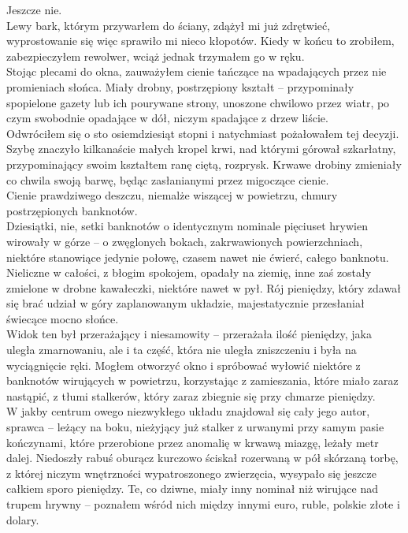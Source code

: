 \documentclass[../MAIN.tex]{subfiles}
\begin{document}
Jeszcze nie.\\
Lewy bark, którym przywarłem do ściany, zdążył mi już zdrętwieć, wyprostowanie się więc sprawiło mi nieco kłopotów. Kiedy w końcu to zrobiłem, zabezpieczyłem rewolwer, wciąż jednak trzymałem go w ręku.\\
Stojąc plecami do okna, zauważyłem cienie tańczące na wpadających przez nie promieniach słońca. Miały drobny, postrzępiony kształt -- przypominały spopielone gazety lub ich pourywane strony, unoszone chwilowo przez wiatr, po czym swobodnie opadające w dół, niczym spadające z drzew liście.\\
Odwróciłem się o sto osiemdziesiąt stopni i natychmiast pożałowałem tej decyzji.\\
Szybę znaczyło kilkanaście małych kropel krwi, nad którymi górował szkarłatny, przypominający swoim kształtem ranę ciętą, rozprysk. Krwawe drobiny zmieniały co chwila swoją barwę, będąc zasłanianymi przez migoczące cienie.\\
Cienie prawdziwego deszczu, niemalże wiszącej w powietrzu, chmury postrzępionych banknotów.\\
Dziesiątki, nie, setki banknotów o identycznym nominale pięciuset hrywien wirowały w górze -- o zwęglonych bokach, zakrwawionych powierzchniach, niektóre stanowiące jedynie połowę, czasem nawet nie ćwierć, całego banknotu. Nieliczne w całości, z błogim spokojem, opadały na ziemię, inne zaś zostały zmielone w drobne kawałeczki, niektóre nawet w pył. Rój pieniędzy, który zdawał się brać udział w góry zaplanowanym układzie, majestatycznie przesłaniał świecące mocno słońce.\\
Widok ten był przerażający i niesamowity -- przerażała ilość pieniędzy, jaka uległa zmarnowaniu, ale i ta część, która nie uległa zniszczeniu i była na wyciągnięcie ręki. Mogłem otworzyć okno i spróbować wyłowić niektóre z banknotów wirujących w powietrzu, korzystając z zamieszania, które miało zaraz nastąpić, z tłumi stalkerów, który zaraz zbiegnie się przy chmarze pieniędzy.\\
W jakby centrum owego niezwykłego układu znajdował się cały jego autor, sprawca -- leżący na boku, nieżyjący już stalker z urwanymi przy samym pasie kończynami, które przerobione przez anomalię w krwawą miazgę, leżały metr dalej. Niedoszły rabuś oburącz kurczowo ściskał rozerwaną w pół skórzaną torbę, z której niczym wnętrzności wypatroszonego zwierzęcia, wysypało się jeszcze całkiem sporo pieniędzy. Te, co dziwne, miały inny nominał niż wirujące nad trupem hrywny -- poznałem wśród nich między innymi euro, ruble, polskie złote i dolary.\\
\end{document}
